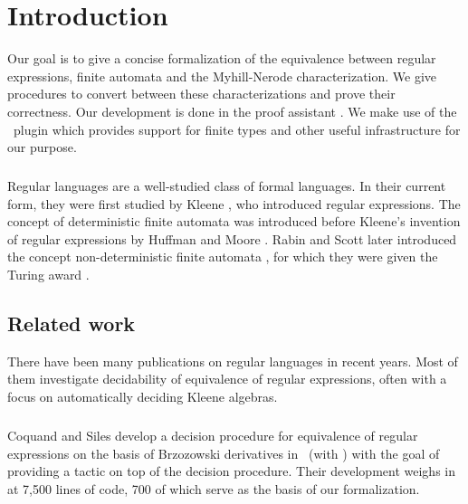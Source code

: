 \chapter{Introduction}
\label{chap:intro}

Our goal is to give a concise formalization of the equivalence between regular expressions, finite automata and the Myhill-Nerode characterization. 
We give procedures to convert between these characterizations and prove their correctness.
Our development is done in the proof assistant \coq.
We make use of the \ssreflect\ plugin which provides support for finite types and other useful infrastructure for our purpose.

\paragraph{}
Regular languages are a well-studied class of formal languages. 
In their current form, they were first studied by Kleene \cite{KleeneNets}, who introduced regular expressions. 
The concept of deterministic finite automata was introduced before Kleene's invention of regular expressions by Huffman \cite{Huffman1954161} and Moore \cite{Moore56}. 
Rabin and Scott later introduced the concept non-deterministic finite automata \cite{Rabin:1959:FAD:1661907.1661909}, for which they were given the Turing award \cite{Ashenhurst:1987:ATA:27609}.



\section{Related work}

There have been many publications on regular languages in recent years.
Most of them investigate decidability of equivalence of regular expressions, often with a focus on automatically deciding Kleene algebras.

\paragraph{}
Coquand and Siles develop a decision procedure for equivalence of regular expressions \cite{DBLP:conf/cpp/CoquandS11} on the basis of Brzozowski derivatives \cite{DBLP:journals/jacm/Brzozowski64} in \coq\ (with \ssreflect) with the goal of providing a tactic on top of the decision procedure. Their development weighs in at 7,500 lines of code, 700 of which serve as the basis of our formalization.

